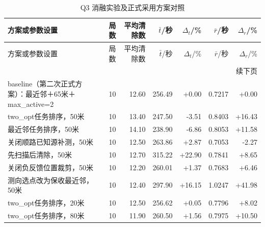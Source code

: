 \begingroup\small\setlength{\tabcolsep}{3pt}
\begin{longtable}{p{}rrrrrr}
\caption{Q3 消融实验及正式采用方案对照}\label{tab:official-q3-1}\\
\toprule
方案或参数设置 & 局数 & 平均清除数 & $\bar t$/秒 & $\Delta_t$/\% & $\bar r$/秒 & $\Delta_r$/\% \\
\midrule\endfirsthead
\toprule
方案或参数设置 & 局数 & 平均清除数 & $\bar t$/秒 & $\Delta_t$/\% & $\bar r$/秒 & $\Delta_r$/\% \\
\midrule\endhead
\midrule\multicolumn{7}{r}{续下页}\\\endfoot
\bottomrule\endlastfoot
baseline（第二次正式方案）：最近邻＋65米＋max\_active=2 & 10 & 12.60 & 256.49 & +0.00 & 0.7217 & +0.00 \\
two\_opt任务排序，50米 & 10 & 13.40 & 247.50 & -3.51 & 0.8403 & +16.43 \\
最近邻任务排序，50米 & 10 & 14.10 & 238.90 & -6.86 & 0.8053 & +11.58 \\
关闭顺路已知源补测，50米 & 10 & 12.50 & 263.86 & +2.87 & 0.7053 & -2.27 \\
先扫描后清除，50米 & 10 & 12.70 & 315.22 & +22.90 & 0.7841 & +8.65 \\
关闭负反馈位置裁剪，50米 & 10 & 12.20 & 260.01 & +1.37 & 0.7683 & +6.46 \\
测向选点改为保收最近邻，50米 & 10 & 12.40 & 297.90 & +16.15 & 1.0247 & +41.98 \\
two\_opt任务排序，20米 & 10 & 12.50 & 256.62 & +0.05 & 0.7796 & +8.02 \\
two\_opt任务排序，80米 & 10 & 11.90 & 260.50 & +1.56 & 0.7975 & +10.50 \\
\end{longtable}\endgroup
